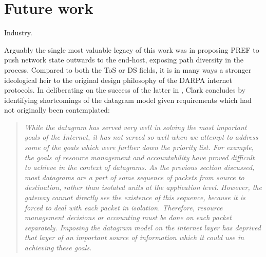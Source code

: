 %
%
%
\section{Future work}

Industry.


Arguably the single most valuable legacy of this work was in proposing \acl{PREF} to push network state outwards to the end-host, exposing path diversity in the process.
Compared to both the \ac{ToS} or \ac{DS} fields, it is in many ways a stronger ideological heir to the original design philosophy of the \acs{DARPA} internet protocols.
In deliberating on the success of the latter in \cite{Clark:1988p478}, Clark concludes by identifying shortcomings of the datagram model given requirements which had not originally been contemplated:

\begin{quote}
\textit{While the datagram has served very well in solving the most important goals of the Internet, it has not served so well when we attempt to address some of the goals which were further down the priority list. 
For example, the goals of resource management and accountability have proved difficult to achieve in the context of datagrams.
As the previous section discussed, most datagrams are a part of some sequence of packets from source to destination, rather than isolated units at the application level.  
However, the gateway cannot directly see the existence of this sequence, because it is forced to deal with each packet in isolation.  
Therefore, resource management decisions or accounting must be done on each packet separately.  
Imposing the datagram model on the internet layer has deprived that layer of an important source of information which it could use in achieving these goals.}
\end{quote}

